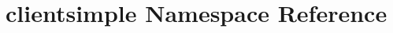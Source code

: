 \hypertarget{namespaceclientsimple}{\section{clientsimple Namespace Reference}
\label{namespaceclientsimple}
}

